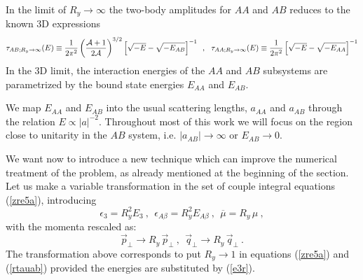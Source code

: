 \documentclass[twocolumn,showpacs,aps,prl,10pt]{revtex4}
\begin{document}
In  the limit of $R_y\to\infty$  the two-body amplitudes for $AA$ and $AB$ 
reduces to the known 3D expressions
\begin{equation}
\tau_{A B;R_y\to\infty}(E)\equiv
\frac{1}{2\pi^2}\left(\frac{{\cal A}+1}{2{\cal A}}\right)^{3/2}
\left[\sqrt{-E} -
\sqrt{-E_{AB}}\right]^{-1}  \,\,\, ,\,\,\,\,
\tau_{A A;R_y\to\infty}(E)\equiv \frac{1}{2\pi^2}
\left[\sqrt{-E} - \sqrt{-E_{AA}}
\right]^{-1}  \label{taua}
\end{equation}
In the 3D limit, the interaction energies
of the $AA$ and $AB$ subsystems are parametrized by the bound state energies $E_{AA}$ and $E_{AB}$.


We map $E_{AA}$ and $E_{AB}$ into the usual scattering lengths,
$a_{AA}$ and $a_{AB}$ through the relation $E\propto |a|^{-2}$.
Throughout most of this work we will focus on the
region close to unitarity in the $AB$ system, i.e. $|a_{AB}|\to \infty$ or $E_{AB}\to 0$.


We want now to introduce a new technique which can improve the numerical 
treatment of the problem, as already mentioned at the beginning of the 
section. Let us make a variable transformation in the set of couple integral 
equations (\ref{zre5a}), introducing 
\begin{equation}
\epsilon_3=R_y^2E_3~,~~\epsilon_{A\beta}=R_y^2E_{A\beta}~,~~\overline \mu=R_y\,\mu~, \label{e3r}
\end{equation}
with the momenta rescaled as:
\begin{equation}
\vec p_\perp\to R_y\,\vec p_\perp~,~~\vec q_\perp\to R_y\,\vec q_\perp~. \label{qpr}
\end{equation}
The transformation above corresponds to put  $R_y\to1$ in equations (\ref{zre5a}) and (\ref{rtauab}) 
provided the energies are substituted by (\ref{e3r}).
\end{document}
